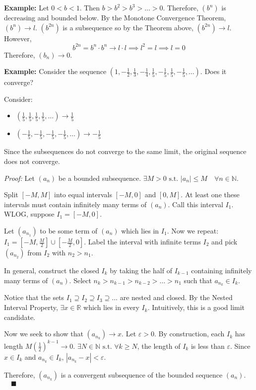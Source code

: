 \documentclass[12pt]{report}
\newcommand{\R}{\mathbb{R}}
\newcommand{\N}{\mathbb{N}}
\newcommand{\qed}{\quad \blacksquare}
\newcommand{\abs}[1]{\left\vert #1 \right\vert}
\newcommand{\st}{\text{ s.t. }}
\newcommand{\ep}{\varepsilon}
\newenvironment*{tbox}[2][gray]{
    \begin{tcolorbox}[
        parbox=false,
        colback=#1!5!white,
        colframe=#1!75!black,
        breakable,
        title={#2}
    ]}
    {\end{tcolorbox}}
\begin{document}
        \textbf{Example:} Let $0 < b < 1$. Then $b > b^2 > b^3 > \dots > 0$. Therefore, $(b^n)$ is decreasing and bounded below. By the Monotone Convergence Theorem, $(b^n) \to l$. $(b^{2n})$ is a subsequence so by the Theorem above, $(b^{2n}) \to l$. However, 
        \[b^{2n} = b^n \cdot b^n \to l \cdot l \implies l^2 = l \implies l = 0\]
        Therefore, $(b_n) \to 0$. 

        \textbf{Example:} Consider the sequence $(1 , -\frac{1}{2}, \frac{1}{3}, -\frac{1}{4}, \frac{1}{5}, -\frac{1}{5}, \frac{1}{5}, -\frac{1}{5}, \dots)$. Does it converge? 

        Consider: 
        \begin{itemize}
            \item $(\frac{1}{5}, \frac{1}{5}, \frac{1}{5}, \frac{1}{5}, \dots) \to \frac{1}{5}$
            \item $(-\frac{1}{5}, -\frac{1}{5}, -\frac{1}{5}, -\frac{1}{5}, \dots) \to -\frac{1}{5}$
        \end{itemize}
        Since the subsequences do not converge to the same limit, the original sequence does not converge.

        \begin{tbox}{\textbf{Theorem (Bolzano-Weierstrass):} Every bounded sequence contains a convergent subsequence}
            \emph{Proof:} Let $(a_n)$ be a bounded subsequence. $\exists M > 0 \st \abs{a_n} \leq M \quad \forall n \in \N$.

            Split $[-M, M]$ into equal intervals $[-M, 0]$ and $[0, M]$. At least one these intervals must contain infinitely many terms of $(a_n)$. Call this interval $I_1$. WLOG, suppose $I_1 = [-M, 0]$. 

            Let $(a_{n_1})$ to be some term of $(a_n)$ which lies in $I_1$. Now we repeat: $I_1 = [-M, \frac{M}{2}] \cup [-\frac{M}{2}, 0]$. Label the interval with infinite terms $I_2$ and pick $(a_{n_2})$ from $I_2$ with $n_2 > n_1$. 

            In general, construct the closed $I_k$ by taking the half of $I_{k-1}$ containing infinitely many terms of $(a_n)$. Select $n_{k} > n_{k-1} > n_{k-2} > \dots > n_1$ such that $a_{n_k} \in I_k$. 

            Notice that the sets $I_1 \supseteq I_2 \supseteq I_3 \supseteq \dots$ are nested and closed. By the Nested Interval Property, $\exists x \in \R$ which lies in every $I_k$. Intuitively, this is a good limit candidate. 

            Now we seek to show that $(a_{n_k}) \to x$. Let $\ep > 0$. By construction, each $I_k$ has length $M(\frac{1}{2})^{k-1} \to 0$. $\exists N \in \N \st \forall k \geq N$, the length of $I_k$ is less than $\ep$. Since $x \in I_k$ and $a_{n_k} \in I_k$, $\abs{a_{n_k} - x} <\ep$. 

            Therefore, $(a_{n_k})$ is a convergent subsequence of the bounded sequence $(a_n)$. $\qed$
        \end{tbox}
\end{document}
